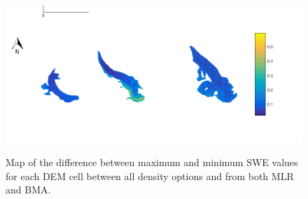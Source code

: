 \documentclass[12pt]{article}
\begin{document}
\begin{landscape}
\begin{figure}
	\centering
	\includegraphics[height = 0.5\textwidth]{SWEdifferenceMap.png}\\
	\caption{Map of the difference between maximum and minimum SWE values for each DEM cell between all density options and from both MLR and BMA.}
	\label{fig:SWEdiffMap}
\end{figure}
\end{landscape}
	
\pagebreak


\end{document}
